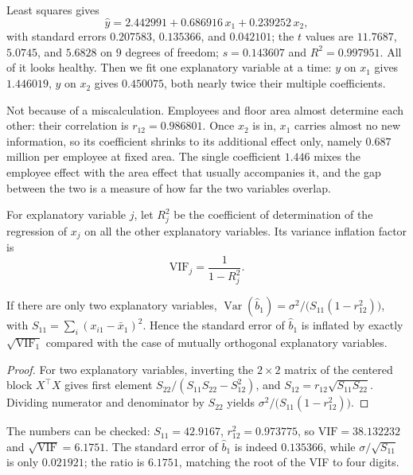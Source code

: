 Least squares gives
\[
\hat y=2.442991+0.686916\,x_1+0.239252\,x_2,
\]
with standard errors $0.207583$, $0.135366$, and $0.042101$; the $t$ values are
$11.7687$, $5.0745$, and $5.6828$ on $9$ degrees of freedom; $s=0.143607$ and
$R^2=0.997951$. All of it looks healthy. Then we fit one explanatory variable at a time: $y$ on
$x_1$ gives $1.446019$, $y$ on $x_2$ gives $0.450075$, both nearly twice their multiple
coefficients.

Not because of a miscalculation. Employees and floor area almost determine each other: their
correlation is $r_{12}=0.986801$. Once $x_2$ is in, $x_1$ carries almost no new information, so
its coefficient shrinks to its additional effect only, namely $0.687$ million per employee at
fixed area. The single coefficient $1.446$ mixes the employee effect with the area effect that
usually accompanies it, and the gap between the two is a measure of how far the two variables
overlap.

\begin{definisi}
For explanatory variable $j$, let $R_j^2$ be the coefficient of determination of the regression
of $x_j$ on all the other explanatory variables. Its variance inflation factor is
\[
\mathrm{VIF}_j=\frac{1}{1-R_j^2}.
\]
\end{definisi}


\begin{proposisi}
If there are only two explanatory variables, $\operatorname{Var}(\hat b_1)=\sigma^2/\bigl(S_{11}
(1-r_{12}^2)\bigr)$, with $S_{11}=\sum_i(x_{i1}-\bar x_1)^2$. Hence the standard error of
$\hat b_1$ is inflated by exactly $\sqrt{\mathrm{VIF}_1}$ compared with the case of mutually
orthogonal explanatory variables.
\end{proposisi}

\begin{proof}[Proof]
For two explanatory variables, inverting the $2\times2$ matrix of the centered block
$X^{\top}X$ gives first element $S_{22}/(S_{11}S_{22}-S_{12}^2)$, and
$S_{12}=r_{12}\sqrt{S_{11}S_{22}}$. Dividing numerator and denominator by $S_{22}$ yields
$\sigma^2/\bigl(S_{11}(1-r_{12}^2)\bigr)$.
\end{proof}

The numbers can be checked: $S_{11}=42.9167$, $r_{12}^2=0.973775$, so $\mathrm{VIF}=38.132232$
and $\sqrt{\mathrm{VIF}}=6.1751$. The standard error of $\hat b_1$ is indeed $0.135366$, while
$\sigma/\sqrt{S_{11}}$ is only $0.021921$; the ratio is $6.1751$, matching the root of the VIF
to four digits.

